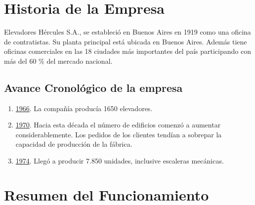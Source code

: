\section{Historia de la Empresa}
Elevadores H\'{e}rcules S.A., se estableci\'{o} en Buenos Aires en 1919 como una oficina de contratistas.
Su planta principal est\'{a} ubicada en Buenos Aires. Adem\'{a}s tiene oficinas comerciales en las 18 ciudades m\'{a}s importantes del pa\'{i}s participando con m\'{a}s del 60 \% del mercado nacional.

\subsection{Avance Cronol\'{o}gico de la empresa}
\begin{enumerate}
	\item \underline{1966}. La compa\~{n}\'{i}a produc\'{i}a 1650 elevadores. 
	\item \underline{1970}. Hacia esta d\'{e}cada el n\'{u}mero de edificios comenz\'{o} a aumentar considerablemente. Los pedidos de los clientes tend\'{i}an a sobrepar la capacidad de producci\'{o}n de la f\'{a}brica.
	\item \underline{1974}. Lleg\'{o} a producir 7.850 unidades, inclusive escaleras mec\'{a}nicas.
\end{enumerate}

\section{Resumen del Funcionamiento}

